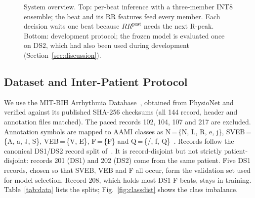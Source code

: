 \documentclass[conference]{IEEEtran}
\begin{document}
\begin{figure}[t]
\caption{System overview. Top: per-beat inference with a three-member INT8 ensemble; the beat and its RR features feed every member. Each decision waits one beat because $RR^{\mathrm{post}}$ needs the next R-peak. Bottom: development protocol; the frozen model is evaluated once on DS2, which had also been used during development (Section~\ref{sec:discussion}).}
\label{fig:system}
\end{figure}

\subsection{Dataset and Inter-Patient Protocol}
We use the MIT-BIH Arrhythmia Database~\cite{moody2001impact,goldberger2000physiobank}, obtained from PhysioNet and verified against its published SHA-256 checksums (all 144 record, header and annotation files matched). The paced records 102, 104, 107 and 217 are excluded. Annotation symbols are mapped to AAMI classes as N\,=\,\{N, L, R, e, j\}, SVEB\,=\,\{A, a, J, S\}, VEB\,=\,\{V, E\}, F\,=\,\{F\} and Q\,=\,\{/, f, Q\}~\cite{aami2012ec57}. Records follow the canonical DS1/DS2 record split of~\cite{dechazal2004automatic}. It is record-disjoint but not strictly patient-disjoint: records 201 (DS1) and 202 (DS2) come from the same patient. Five DS1 records, chosen so that SVEB, VEB and F all occur, form the validation set used for model selection. Record 208, which holds most DS1 F beats, stays in training. Table~\ref{tab:data} lists the splits; Fig.~\ref{fig:classdist} shows the class imbalance.
\end{document}
